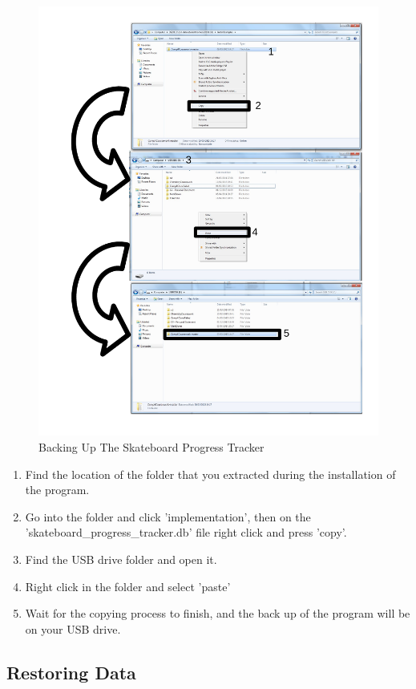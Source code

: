 \begin{figure}[H]
    \includegraphics[width=\textwidth]{./Manual/Images/BackUp.pdf}
    \caption{Backing Up The Skateboard Progress Tracker} \label{fig:BackUp}
\end{figure}

\begin{enumerate}
\item Find the location of the folder that you extracted during the installation of the program.
\item Go into the folder and click 'implementation', then on the 'skateboard\_progress\_tracker.db' file right click and press 'copy'.
\item Find the USB drive folder and open it.
\item Right click in the folder and select 'paste' 
\item Wait for the copying process to finish, and the back up of the program will be on your USB drive.
\end{enumerate}

\subsection{Restoring Data}

